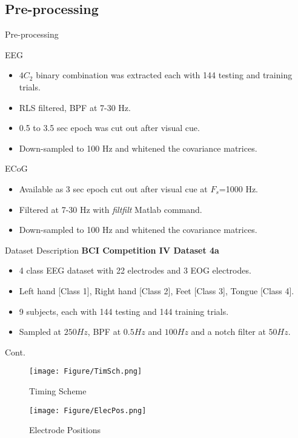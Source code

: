 \documentclass[11pt]{beamer}
\begin{document}
\subsection{Pre-processing}
\begin{frame}[shrink=5]{Pre-processing}
\begin{block}{EEG}
  \begin{itemize}
    \item $4C_2$ binary combination was extracted each with 144 testing and training trials.
      \item RLS filtered, BPF at 7-30 Hz.
        \item 0.5 to 3.5 sec epoch was cut out after visual cue.
        \item Down-sampled to 100 Hz and whitened the covariance matrices.
     \end{itemize} 
    \end{block}
\begin{block}{ECoG}
 \begin{itemize}
    \item Available as 3 sec epoch cut out after visual cue at $F_s$=1000 Hz.
      \item Filtered at 7-30 Hz with \emph{filtfilt} Matlab command.
        \item Down-sampled to 100 Hz and whitened the covariance matrices.
     \end{itemize}
         \end{block}
\end{frame}
\begin{frame}{Dataset Description}
\textbf{BCI Competition IV Dataset 4a}
  \begin{itemize}
    \item 4 class EEG dataset with 22 electrodes and 3 EOG electrodes.
      \item Left hand [Class 1], Right hand [Class 2], Feet [Class 3], Tongue [Class 4].
        \item 9 subjects, each with 144 testing and 144 training trials.
        \item Sampled at $250 Hz$, BPF at $0.5 Hz$ and $100 Hz$ and a notch filter at $50 Hz$. 
     \end{itemize} 
    \end{frame}
\begin{frame}{Cont.}
   \begin{figure}
\texttt{[image: Figure/TimSch.png]}
 \caption {Timing Scheme}
\end{figure}
\begin{figure}
  \texttt{[image: Figure/ElecPos.png]}
 \caption {Electrode Positions}
\end{figure}
\end{frame}
\end{document}
